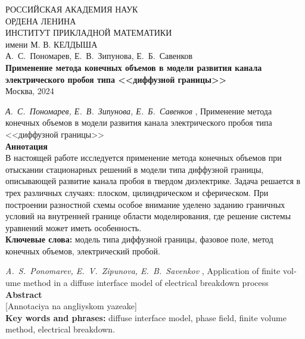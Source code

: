 \documentclass[a4paper,12pt]{article}
\theoremstyle{plain}
\theoremstyle{remark}
\newcommand{\PreprintTitle}{
	Применение метода конечных объемов в модели развития канала электрического пробоя типа <<диффузной границы>>
}
\newcommand{\PreprintTitleEnglish}{
	Application of finite volume method in a diffuse interface model of electrical breakdown process
}
\newcommand{\PreprintAuthors}{
	А.~С.~Пономарев, Е.~В.~Зипунова, Е.~Б.~Савенков
}
\newcommand{\PreprintAuthorsEnglish}{
	A.~S.~Ponomarev, E.~V.~Zipunova, E.~B.~Savenkov
}
\begin{document}
\begin{titlepage}

\begin{center}
	РОССИЙСКАЯ АКАДЕМИЯ НАУК \\
	ОРДЕНА ЛЕНИНА \\
	ИНСТИТУТ ПРИКЛАДНОЙ МАТЕМАТИКИ \\
	имени М. В. КЕЛДЫША \\

	\vspace*{60mm}
	\Large{\PreprintAuthors} \\
	\vspace*{20mm}
	\textbf{\large \PreprintTitle} \\
	\vspace*{110mm}
	\Large{Москва, 2024}
	\vspace*{-50mm}
\end{center}

\end{titlepage}

\setcounter{page}{2}

\thispagestyle{empty}

\noindent \emph{\PreprintAuthors}, \PreprintTitle \\[3mm]
\textbf{Аннотация} \\
{
	\small
	В настоящей работе исследуется применение метода конечных объемов при отыскании стационарных решений в модели типа диффузной границы, описывающей развитие канала пробоя в твердом диэлектрике. Задача решается в трех различных случаях: плоском, цилиндрическом и сферическом. При построении разностной схемы особое внимание уделено заданию граничных условий на внутренней границе области моделирования, где решение системы уравнений может иметь особенность. \\[3mm]
	\textbf{Ключевые слова:} модель типа диффузной границы, фазовое поле, метод конечных объемов, электрический пробой. \\[5mm]
}
\begin{otherlanguage}{english}
\emph{\PreprintAuthorsEnglish}, \PreprintTitleEnglish \\[3mm]
\textbf{Abstract} \\
{
	\small
	[Annotaciya na angliyskom yazeake] \\[3mm]
	\textbf{Key words and phrases:} diffuse interface model, phase field, finite volume method, electrical breakdown. \\[5mm]
}
\end{otherlanguage}

\clearpage











\clearpage
\printbibliography

\clearpage
\tableofcontents
\end{document}
